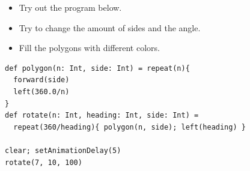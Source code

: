 \begin{itemize}

\item {Try out the program below.}
\item {Try to change the amount of sides and the angle.}
\item {Fill the polygons with different colors.}

\end{itemize}



  

\begin{lstlisting}[basicstyle={\ttfamily\fontsize{16}{19}\selectfont},numbers=none]
def polygon(n: Int, side: Int) = repeat(n){
  forward(side)
  left(360.0/n)
}
def rotate(n: Int, heading: Int, side: Int) = 
  repeat(360/heading){ polygon(n, side); left(heading) }

clear; setAnimationDelay(5)
rotate(7, 10, 100)
\end{lstlisting}
        
